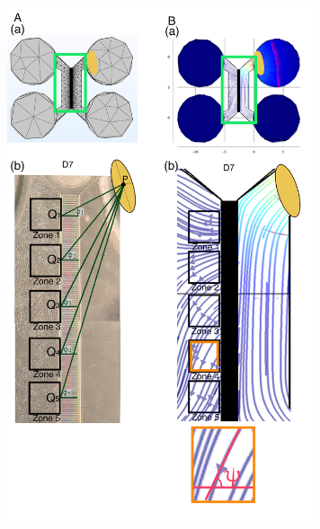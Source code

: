 \documentclass[review]{elsarticle}
\begin{document}
\begin{figure}
	\begin{center}
		\includegraphics[width=9cm]{Fig_75.jpg}
	\end{center}

\end{figure}
\end{document}
